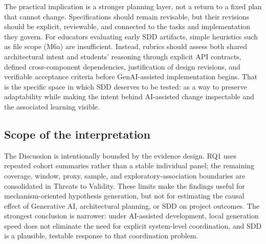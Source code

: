 The practical implication is a stronger planning layer, not a return to a
fixed plan that cannot change. Specifications should remain revisable, but
their revisions should be explicit, reviewable, and connected to the tasks and
implementation they govern. For educators evaluating early SDD artifacts,
simple heuristics such as file scope (M6a) are insufficient. Instead, rubrics
should assess both shared architectural intent and students' reasoning through
explicit API contracts, defined cross-component dependencies, justification
of design revisions, and verifiable acceptance criteria before GenAI-assisted
implementation begins. That is the specific space in which SDD deserves to be
tested: as a way to preserve adaptability while making the intent behind
AI-assisted change inspectable and the associated learning visible.

\subsection{Scope of the interpretation}

The Discussion is intentionally bounded by the evidence design. RQ1 uses
repeated cohort summaries rather than a stable individual panel; the remaining
coverage, window, proxy, sample, and exploratory-association boundaries are
consolidated in Threats to Validity. These limits make the findings useful for
mechanism-oriented hypothesis generation, but not for estimating the causal
effect of Generative AI, architectural planning, or SDD on project outcomes.
The strongest conclusion is narrower: under
AI-assisted development, local generation speed does not eliminate the need for
explicit system-level coordination, and SDD is a plausible, testable response
to that coordination problem.
